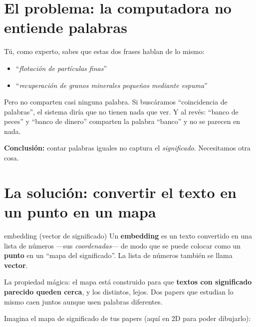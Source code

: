 \documentclass[11pt,a4paper]{article}
\begin{document}

\section{El problema: la computadora no entiende palabras}

Tú, como experto, sabes que estas dos frases hablan de lo mismo:
\begin{itemize}
  \item ``\emph{flotación de partículas finas}''
  \item ``\emph{recuperación de granos minerales pequeños mediante espuma}''
\end{itemize}
Pero no comparten casi ninguna palabra. Si buscáramos ``coincidencia de palabras'', el
sistema diría que no tienen nada que ver. Y al revés: ``banco de peces'' y ``banco de
dinero'' comparten la palabra ``banco'' y no se parecen en nada.

\textbf{Conclusión:} contar palabras iguales no captura el \emph{significado}. Necesitamos
otra cosa.

\section{La solución: convertir el texto en un punto en un mapa}

\begin{concepto}{embedding (vector de significado)}
Un \textbf{embedding} es un texto convertido en una lista de números —sus
\emph{coordenadas}— de modo que se puede colocar como un \textbf{punto} en un ``mapa del
significado''. La lista de números también se llama \textbf{vector}.

La propiedad mágica: el mapa está construido para que \textbf{textos con significado
parecido queden cerca}, y los distintos, lejos. Dos papers que estudian lo mismo caen
juntos aunque usen palabras diferentes.
\end{concepto}

Imagina el mapa de significado de tus papers (aquí en 2D para poder dibujarlo):

\begin{center}
\end{center}
\end{document}
